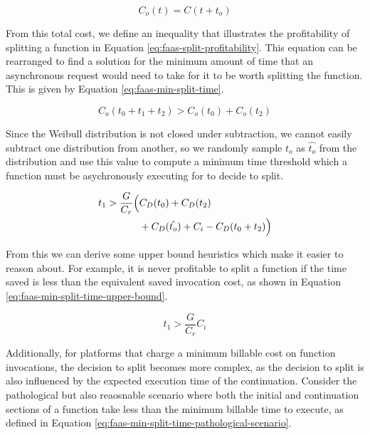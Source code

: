 \begin{equation}
\label{eq:faas-cost-with-startup-overhead}
C_o(t) = C(t + t_o)
\end{equation}

From this total cost, we define an inequality that illustrates the profitability of splitting a function in Equation \ref{eq:faas-split-profitability}. This equation can be rearranged to find a solution for the minimum amount of time that an asynchronous request would need to take for it to be worth splitting the function. This is given by Equation \ref{eq:faas-min-split-time}.

\begin{equation} \label{eq:faas-split-profitability}
C_o(t_0 + t_1 + t_2) > C_o(t_0) + C_o(t_2)
\end{equation}

Since the Weibull distribution is not closed under subtraction, we cannot easily subtract one distribution from another, so we randomly sample $t_o$ as $\hat{t_o}$ from the distribution and use this value to compute a minimum time threshold which a function must be asychronously executing for to decide to split.

\begin{equation} \label{eq:faas-min-split-time}
\begin{aligned}
t_1 > \frac{G}{C_r} \Bigl( & C_D(t_0) + C_D(t_2) \\
& + C_D(\hat{t_o}) + C_i - C_D(t_0 + t_2) \Bigl)
\end{aligned}
\end{equation}

From this we can derive some upper bound heuristics which make it easier to reason about. For example, it is never profitable to split a function if the time saved is less than the equivalent saved invocation cost, as shown in Equation \ref{eq:faas-min-split-time-upper-bound}.

\begin{equation} \label{eq:faas-min-split-time-upper-bound}
t_1 > \frac{G}{C_r} C_i
\end{equation}

Additionally, for platforms that charge a minimum billable cost on function invocations, the decision to split becomes more complex, as the decision to split is also influenced by the expected execution time of the continuation. Consider the pathological but also reaosnable scenario where both the initial and continuation sections of a function take less than the minimum billable time to execute, as defined in Equation \ref{eq:faas-min-split-time-pathological-scenario}.

